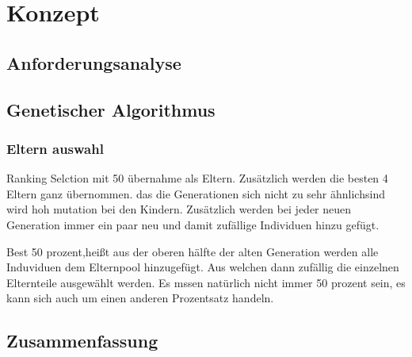 \section{Konzept}
\subsection{Anforderungsanalyse}



\subsection{Genetischer Algorithmus}
\subsubsection{Eltern auswahl} 
Ranking Selction mit 50 übernahme als Eltern.
Zusätzlich werden die besten 4 Eltern ganz übernommen. das die Generationen sich nicht zu sehr ähnlichsind wird hoh mutation bei den Kindern. Zusätzlich werden bei jeder neuen Generation immer ein paar neu und damit zufällige Individuen hinzu gefügt. 

Best 50 prozent,heißt aus der oberen hälfte der alten Generation werden alle Induviduen dem Elternpool hinzugefügt. Aus welchen dann zufällig die einzelnen Elternteile ausgewählt werden. Es mssen natürlich nicht immer 50 prozent sein, es kann sich auch um einen anderen Prozentsatz handeln.


\subsection{Zusammenfassung}